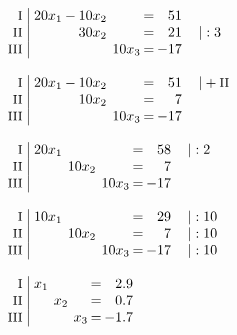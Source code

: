\begin{equation*}
\begin{array}{l}
\begin{array}{r|rcrcrcrl}
\end{array}
\\ \\
\setlength{\arraycolsep}{1pt}
\begin{array}{r|rcrcrcrl}
    \text{\small I } &\; 20x_{1} & - & 10x_{2} &  &         & = &  51 &          \\
   \text{\small II } &\;         &   & 30x_{2} &  &         & = &  21 & \quad|:3 \\
  \text{\small III } &\;         &   &         &  & 10x_{3} & = & -17 &            
\end{array}
\\ \\
\setlength{\arraycolsep}{1pt}
\begin{array}{r|rcrcrcrl}
    \text{\small I } &\; 20x_{1} & - & 10x_{2} &  &         & = &  51 & \quad|+\text{\small II} \\
   \text{\small II } &\;         &   & 10x_{2} &  &         & = &   7 &                         \\
  \text{\small III } &\;         &   &         &  & 10x_{3} & = & -17 &                           
\end{array}
\\ \\
\setlength{\arraycolsep}{1pt}
\begin{array}{r|rcrcrcrl}
    \text{\small I } &\; 20x_{1} &  &         &  &         & = &  58 & \quad|:2 \\
   \text{\small II } &\;         &  & 10x_{2} &  &         & = &   7 &          \\
  \text{\small III } &\;         &  &         &  & 10x_{3} & = & -17 &            
\end{array}
\\ \\
\setlength{\arraycolsep}{1pt}
\begin{array}{r|rcrcrcrl}
    \text{\small I } &\; 10x_{1} &  &         &  &         & = &  29 & \quad|:10 \\
   \text{\small II } &\;         &  & 10x_{2} &  &         & = &   7 & \quad|:10 \\
  \text{\small III } &\;         &  &         &  & 10x_{3} & = & -17 & \quad|:10   
\end{array}
\\ \\
\setlength{\arraycolsep}{1pt}
\begin{array}{r|rcrcrcrl}
    \text{\small I } &\; x_{1} &  &       &  &       & = &  2.9 & \\
   \text{\small II } &\;       &  & x_{2} &  &       & = &  0.7 & \\
  \text{\small III } &\;       &  &       &  & x_{3} & = & -1.7 &   
\end{array}
\end{array}
\end{equation*}
